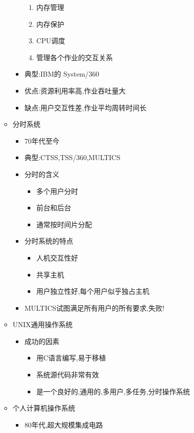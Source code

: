 \documentclass[a4paper,10pt,notitlepage]{article}
\begin{document}
\begin{itemize}
\begin{itemize}
\begin{itemize}
			\begin{enumerate}
				\item 内存管理
				\item 内存保护
				\item CPU调度
				\item 管理各个作业的交互关系
			\end{enumerate}
			\item 典型:IBM的 System/360
			\item 优点:资源利用率高,作业吞吐量大
			\item 缺点:用户交互性差,作业平均周转时间长
		\end{itemize}
		\item 分时系统
		\begin{itemize}
			\item 70年代至今
			\item 典型:CTSS,TSS/360,MULTICS
			\item 分时的含义
			\begin{itemize}
				\item 多个用户分时
				\item 前台和后台
				\item 通常按时间片分配
			\end{itemize}
			\item 分时系统的特点
			\begin{itemize}
				\item 人机交互性好
				\item 共享主机
				\item 用户独立性好,每个用户似乎独占主机
			\end{itemize}
			\item MULTICS试图满足所有用户的所有要求,失败!
		\end{itemize}
		\item UNIX通用操作系统
		\begin{itemize}
			\item 成功的因素
			\begin{itemize}
				\item 用C语言编写,易于移植
				\item 系统源代码非常有效
				\item 是一个良好的,通用的,多用户,多任务,分时操作系统
			\end{itemize}
		\end{itemize}
		\item 个人计算机操作系统
		\begin{itemize}
			\item 80年代,超大规模集成电路

\end{itemize}
\end{itemize}
\end{itemize}
\end{document}
